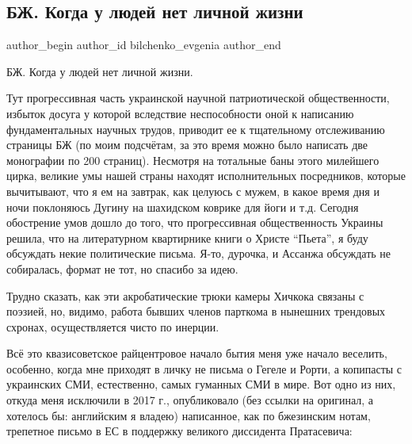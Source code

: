  
 
 
 
 
 
\subsection{БЖ. Когда у людей нет личной жизни}
\label{sec:12_06_2021.fb.bilchenko_evgenia.3.chelovek_lichnaja_zhizn}
\ifcmt
 author_begin
   author_id bilchenko_evgenia
 author_end
\fi

БЖ. Когда у людей нет личной жизни.

Тут прогрессивная часть украинской научной патриотической общественности,
избыток досуга у которой вследствие неспособности оной к написанию
фундаментальных научных трудов, приводит ее к тщательному отслеживанию страницы
БЖ (по моим подсчётам, за это время можно было написать две монографии по 200
страниц). Несмотря на тотальные баны этого милейшего цирка, великие умы нашей
страны находят исполнительных посредников, которые вычитывают, что я ем на
завтрак, как целуюсь с мужем, в какое время дня и ночи поклоняюсь Дугину на
шахидском коврике для йоги и т.д. Сегодня обострение умов дошло до того, что
прогрессивная общественность Украины решила, что на литературном квартирнике
книги о Христе \enquote{Пьета}, я буду обсуждать некие политические письма. Я-то,
дурочка, и Ассанжа обсуждать не собиралась, формат не тот, но спасибо за идею.

Трудно сказать, как эти акробатические трюки камеры Хичкока связаны с поэзией,
но, видимо, работа бывших членов парткома в нынешних трендовых схронах,
осуществляется чисто по инерции.

Всё это квазисоветское райцентровое начало бытия меня уже начало веселить,
особенно, когда мне приходят в личку не письма о Гегеле и Рорти, а копипасты с
украинских СМИ, естественно, самых гуманных СМИ в мире. Вот одно из них, откуда
меня исключили в 2017 г., опубликовало (без ссылки на оригинал, а хотелось бы:
английским я владею) написанное, как по бжезинским нотам, трепетное письмо в ЕС
в поддержку великого диссидента Пратасевича:


